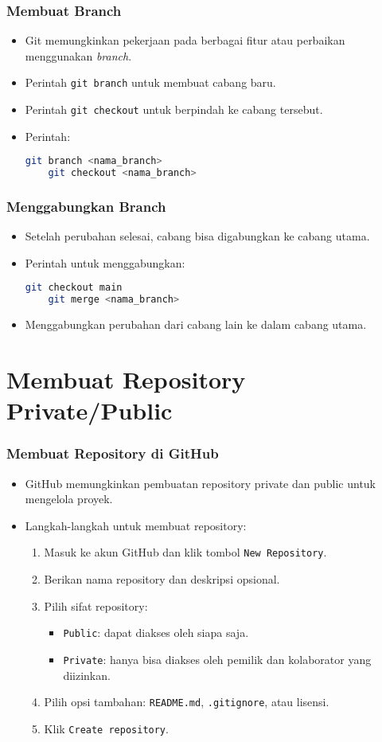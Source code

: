 \documentclass[aspectratio=169, table]{beamer}
\begin{document}
\begin{frame}[fragile]
\frametitle{Membuat Branch}
\begin{itemize}
\item Git memungkinkan pekerjaan pada berbagai fitur atau perbaikan menggunakan \textit{branch}.
\item Perintah \texttt{git branch} untuk membuat cabang baru.
\item Perintah \texttt{git checkout} untuk berpindah ke cabang tersebut.
\item Perintah:
\begin{lstlisting}[language=bash]
	git branch <nama_branch>
	git checkout <nama_branch>
\end{lstlisting}
\end{itemize}
\end{frame}

\begin{frame}[fragile]
\frametitle{Menggabungkan Branch}
\begin{itemize}
\item Setelah perubahan selesai, cabang bisa digabungkan ke cabang utama.
\item Perintah untuk menggabungkan:
\begin{lstlisting}[language=bash]
	git checkout main
	git merge <nama_branch>
\end{lstlisting}
\item Menggabungkan perubahan dari cabang lain ke dalam cabang utama.
\end{itemize}
\end{frame}

\section{Membuat Repository Private/Public}

\begin{frame}[fragile]
\frametitle{Membuat Repository di GitHub}
\begin{itemize}
\item GitHub memungkinkan pembuatan repository private dan public untuk mengelola proyek.
\item Langkah-langkah untuk membuat repository:
\begin{enumerate}
	\item Masuk ke akun GitHub dan klik tombol \texttt{New Repository}.
	\item Berikan nama repository dan deskripsi opsional.
	\item Pilih sifat repository:
	\begin{itemize}
		\item \texttt{Public}: dapat diakses oleh siapa saja.
		\item \texttt{Private}: hanya bisa diakses oleh pemilik dan kolaborator yang diizinkan.
	\end{itemize}
	\item Pilih opsi tambahan: \texttt{README.md}, \texttt{.gitignore}, atau lisensi.
	\item Klik \texttt{Create repository}.
\end{enumerate}
\end{itemize}
\end{frame}
\end{document}
